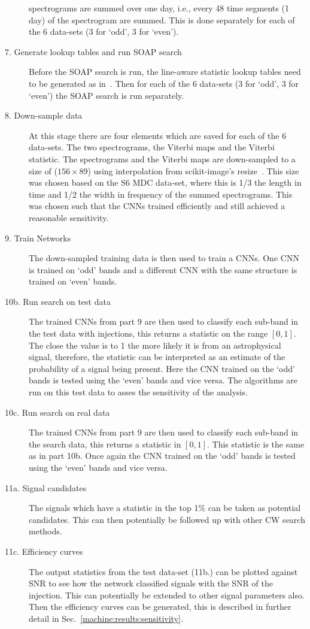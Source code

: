 \begin{description}
	spectrograms are summed over one day, i.e., every 48 time segments (1 day) of
	the spectrogram are summed. This is done separately for each of the 6 data-sets
	(3 for `odd', 3 for `even'). 
	\item[7. Generate lookup tables and run SOAP search] Before the SOAP search is
	run, the line-aware statistic lookup tables need to be generated as
	in~\cite{bayley2019SOAPGeneralised}. Then for each of the 6 data-sets (3 for
	`odd', 3 for `even') the SOAP search is run separately. 
	\item[8. Down-sample data] At this stage there are four elements which are
	saved for each of the 6 data-sets. The two spectrograms, the Viterbi maps and
	the Viterbi statistic. The spectrograms and the Viterbi maps are down-sampled
	to a size of ($156\times 89$) using interpolation from scikit-image's
	resize~\cite{vanderwalt2014ScikitimageImage}. This size was chosen based on the
	S6 \gls{MDC} data-set, where this is 1/3 the length in time and 1/2 the width in
	frequency of the summed spectrograms. 
	This was chosen such that the \glspl{CNN} trained efficiently and still achieved a reasonable sensitivity. 
	\item[9. Train Networks] The down-sampled training data is then used to train a
	\glspl{CNN}. One \gls{CNN} is trained on `odd' bands and a different \gls{CNN} with
	the same structure is trained on `even' bands. 
	\item[10b. Run search on test data] The trained \glspl{CNN} from part 9 are then
	used to classify each sub-band in the test data with injections, this returns a
	statistic on the range $[0,1]$. The close the value is to 1 the more likely it is from an astrophysical signal, therefore,  the statistic can be interpreted as an estimate of the probability of a signal being present. Here the \gls{CNN}
	trained on the `odd' bands is tested using the `even' bands and vice
	versa. The algorithms are run on this test data to asses the sensitivity of the analysis.
	\item[10c. Run search on real data] The trained \glspl{CNN} from part 9 are then
	used to classify each sub-band in the search data, this returns a statistic in
	$[0,1]$. This statistic is the same as in part 10b. 
	Once again the \gls{CNN} trained on the `odd' bands is tested using
	the `even' bands and vice versa.
	\item[11a. Signal candidates] The signals which have a statistic in the top
	1\% can be taken as potential candidates. 
	This can then potentially be followed up with other \gls{CW} search methods. 
	\item[11c. Efficiency curves] The output statistics from the test data-set (11b.) can
	be plotted against \gls{SNR} to see how the network classified signals with the
	\gls{SNR} of the injection. This can potentially be extended to other signal parameters also. 
	Then the efficiency curves can be generated, this is described in further detail in Sec.~\ref{machine:results:sensitivity}.
	
	
\end{description}





